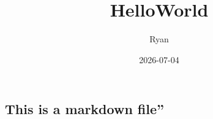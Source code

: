 \documentclass[
]{article}
\title{HelloWorld}
\author{Ryan}
\date{2026-07-04}
\begin{document}
\maketitle

\subsection{This is a markdown file''}\label{this-is-a-markdown-file}
\end{document}
